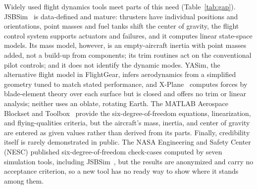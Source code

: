 \documentclass[conf]{new-aiaa}
\begin{document}
Widely used flight dynamics tools meet parts of this need (Table~\ref{tab:gap}).
JSBSim~\cite{berndt2004jsbsim} is data-defined and mature: thrusters have individual positions
and orientations, point masses and fuel tanks shift the center of gravity, the flight control
system supports actuators and failures, and it computes linear state-space models. Its mass
model, however, is an empty-aircraft inertia with point masses added, not a build-up from
components; its trim routines act on the conventional pilot controls; and it does not
identify the dynamic modes. YASim, the alternative flight model in FlightGear, infers
aerodynamics from a simplified geometry tuned to match stated performance, and
X-Plane~\cite{xplane} computes forces by blade-element theory over each surface but is closed
and offers no trim or linear analysis; neither uses an oblate, rotating Earth. The MATLAB
Aerospace Blockset and Toolbox~\cite{mathworks_asb} provide the six-degree-of-freedom
equations, linearization, and flying-qualities criteria, but the aircraft's mass, inertia,
and center of gravity are entered as given values rather than derived from its parts.
Finally, credibility itself is rarely demonstrated in public. The NASA Engineering and Safety
Center (NESC) published six-degree-of-freedom check-cases computed by seven simulation tools,
including JSBSim~\cite{nesc2015,jackson2015}, but the results are anonymized and carry no
acceptance criterion, so a new tool has no ready way to show where it stands among them.
\end{document}
